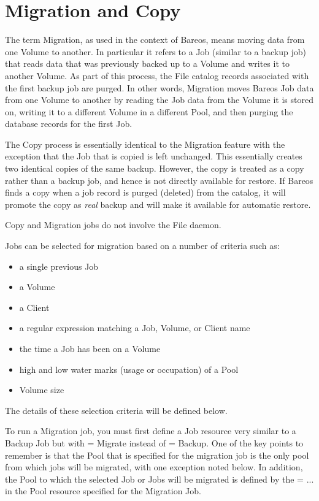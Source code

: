 
\chapter{Migration and Copy}
\label{MigrationChapter}

The term Migration, as used in the context of Bareos, means moving data from
one Volume to another.  In particular it refers to a Job (similar to a backup
job) that reads data that was previously backed up to a Volume and writes
it to another Volume.  As part of this process, the File catalog records
associated with the first backup job are purged.  In other words, Migration
moves Bareos Job data from one Volume to another by reading the Job data
from the Volume it is stored on, writing it to a different Volume in a
different Pool, and then purging the database records for the first Job.

The Copy process is essentially identical to the Migration feature with the
exception that the Job that is copied is left unchanged.  This essentially
creates two identical copies of the same backup. However, the copy is treated
as a copy rather than a backup job, and hence is not directly available for
restore. If Bareos finds a copy when a job record is purged (deleted) from the
catalog, it will promote the copy as \textsl{real} backup and will make it
available for automatic restore.

Copy and Migration jobs do not involve the File daemon.

Jobs can be selected for migration based on a number of criteria such as:
\begin{itemize}
\item a single previous Job
\item a Volume
\item a Client
\item a regular expression matching a Job, Volume, or Client name
\item the time a Job has been on a Volume
\item high and low water marks (usage or occupation) of a Pool
\item Volume size
\end{itemize}

The details of these selection criteria will be defined below.

To run a Migration job, you must first define a Job resource very similar
to a Backup Job but with  = Migrate 
instead of  = Backup.
One of the key points to remember is that the Pool that is
specified for the migration job is the only pool from which jobs will
be migrated, with one exception noted below. In addition, the Pool to
which the selected Job or Jobs will be migrated is defined by the
 = ... in the Pool resource 
specified for the Migration Job.

